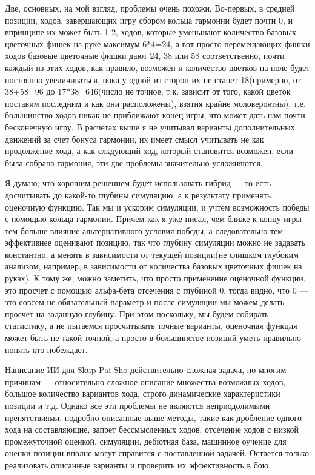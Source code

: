 \documentclass[a4paper,12pt]{diplom}
\begin{document}
Две, основных, на мой взгляд, проблемы очень похожи. Во-первых, в средней позиции, ходов, завершающих игру сбором кольца гармонии будет почти 0, и впринципе их может быть 1-2, ходов, которые уменьшают количество базовых цветочных фишек на руке максимум 6*4=24, а вот просто перемещающих фишки ходов базовые цветочные фишки дают 24, 38 или 58 соответственно, почти каждый из этих ходов, как правило, возможен и количество цветков на поле будет постоянно увеличиваться, пока у одной из сторон их не станет 18(примерно, от 38+58=96 до 17*38=646(число не точное, т.к. зависит от того, какой цветок поставим последним и как они расположены), взятия крайне моловероятны), т.е. большинство ходов никак не приближают конец игры, что может дать нам почти бесконечную игру. В расчетах выше я не учитывал варианты дополнительных движений за счет бонуса гармонии, их имеет смысл учитывать не как продолжение хода, а как слкдующий ход, который становится возможен, если была собрана гармония, эти две проблемы значительно усложняются.

Я думаю, что хорошим решением будет использовать гибрид — то есть досчитывать до какой-то глубины симуляцию, а к результату применять оценочную функцию. Так мы и ускорим симуляции, и учтем возможность победы с помощью кольца гармонии. Причем как я уже писал, чем ближе к концу игры тем больше влияние альтернативного условия победы, а следовательно тем эффективнее оценивают позицию, так что глубину симуляции можно не задавать константно, а менять в зависимости от текущей позиции(не слишком глубоким анализом, например, в зависимости от количества базовых цветочных фишек на руках). К тому же, можно заметить, что просто применение оценочной функции, это просчет с помощью альфа-бета отсечения с глубиной 0, тогда видно, что 0 — это совсем не обязательный параметр и после симуляции мы можем делать просчет на заданную глубину. При этом поскольку, мы будем собирать статистику, а не пытаемся просчитывать точные варианты, оценочная функция может быть не такой точной, а просто в большинстве позиций уметь правильно понять кто побеждает.


Написание ИИ для Skup Pai-Sho действительно сложная задача, по многим причинам — относительно сложное описание множества возможных ходов, большое количество вариантов хода, строго динамические характеристики позиции и т.д. Однако все эти проблемы не являются неприодолимыми препятствиями, подробно описанные выше методы, такие как дробление одного хода на составляющие, запрет бессмысленных ходов, отсечение ходов с низкой промежуточной оценкой, симуляции, дебютная база, машинное оучение для оценки позиции вполне могут справится с поставленной задачей. Остается только реализовать описанные варианты и проверить их эффективность в бою.
\end{document}
